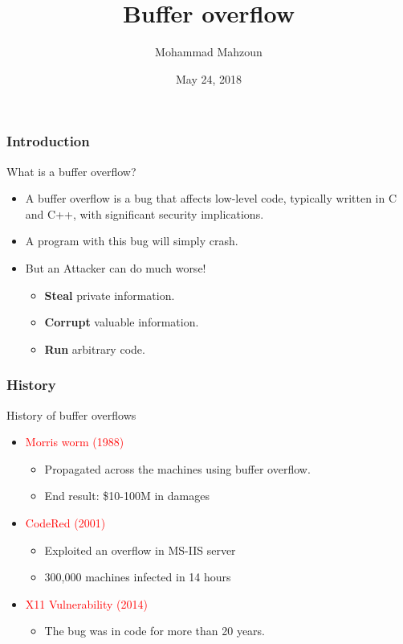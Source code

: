 \documentclass[serif,mathserif]{beamer}
\author[Mohammad Mahzoun]{Mohammad Mahzoun}
\title[Low Level Security\hspace{2em}\insertframenumber/\inserttotalframenumber]{Buffer overflow}
\date{May 24, 2018} %
\institute{University of Tehran}
\begin{document}
\maketitle


\begin{frame}
  \frametitle{Introduction}
  What is a buffer overflow?
  \begin{itemize}
  \item A buffer overflow is a bug that affects low-level code, typically written in C and
 C++, with significant security implications. 
 \item
 	A program with this bug will simply crash.
 	\item
 	But an Attacker can do much worse!
 	\begin{itemize}
 		\item
 			\textbf{Steal} private information.
 		\item
 			\textbf{Corrupt} valuable information.
 		\item
 			\textbf{Run} arbitrary code.
 			
 	\end{itemize}
 
  \end{itemize}
\end{frame}


\begin{frame}
  \frametitle{History}
  History of buffer overflows
  \begin{itemize}
  \item \textcolor{red}{Morris worm (1988)}
	\begin{itemize}
		\item 
			Propagated across the machines using buffer overflow.
		\item
			End result: \$10-100M in damages 
	\end{itemize}	  
  
  \item \textcolor{red}{CodeRed (2001)}
  	\begin{itemize}
		\item 
			Exploited an overflow in MS-IIS server 
		\item
			300,000 machines infected in 14 hours
	\end{itemize}
  \item \textcolor{red}{X11 Vulnerability (2014)}
  	\begin{itemize}
		\item 
			The bug was in code for more than 20 years.
	\end{itemize}
  \end{itemize}
\end{frame}
\end{document}
